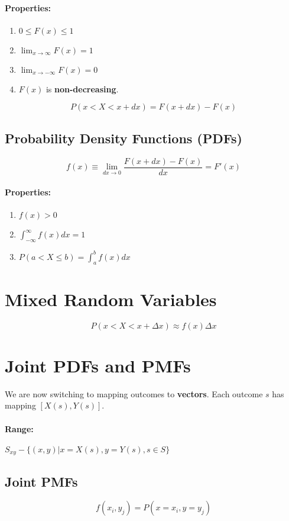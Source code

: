 \documentclass[a4paper,12pt]{report}
\begin{document}
\paragraph{Properties:}
\begin{enumerate}
\item $0 \leq F(x) \leq 1$
\item $\lim_{x \to \infty} F(x) = 1$
\item $\lim_{x \to -\infty} F(x) = 0$
\item $F(x)$ is \textbf{non-decreasing}.
\end{enumerate}

$$P(x < X < x + dx) = F(x + dx) - F(x)$$

\subsection{Probability Density Functions (PDFs)}
$$f(x) \equiv \lim_{dx \to 0} \frac{F(x + dx)- F(x)}{dx} = F'(x)$$
\paragraph{Properties:}
\begin{enumerate}
\item $f(x) > 0$
\item $\int_{-\infty}^{\infty} f(x) dx = 1$
\item $P(a < X \leq b) = \int_a^b f(x) dx$
\end{enumerate}

\section{Mixed Random Variables}
$$P(x < X < x + \Delta x) \approx f(x) \Delta x$$

\section{Joint PDFs and PMFs}
We are now switching to mapping outcomes to \textbf{vectors}. Each outcome $s$ has mapping $[X(s), Y(s)]$. 

\paragraph{Range: } $S_{xy} - \{(x, y) | x = X(s), y = Y(s), s \in S\}$

\subsection{Joint PMFs}
$$f(x_i, y_j) = P(x = x_i, y = y_j)$$
\end{document}
